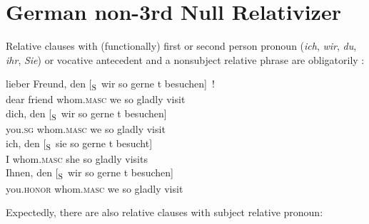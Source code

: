 \documentclass[output=paper]{LSP/langsci}
\begin{document}
\section{German non-3rd Null Relativizer}

\randnum\label{rn:15-8}Relative clauses with (functionally) first or second person pronoun
(\textit{ich}, \textit{wir}, \textit{du}, \textit{ihr}, \textit{Sie}) or vocative antecedent and a nonsubject
relative phrase are obligatorily :

\begin{exe}
\ex%
\label{ex:15-3}
\begin{xlist}
\ex%
\label{ex:15-3a}
\gll lieber Freund, den               [\textsubscript{S}~wir so gerne t besuchen]~!\\
     dear friend    whom.\textsc{masc} \hphantom{[\textsubscript{S}~}we so gladly {} visit\\
\ex%
\label{ex:15-3b}
\gll
dich, den [\textsubscript{S}~wir so gerne t besuchen] \\
you.\textsc{sg} whom.\textsc{masc} \hphantom{[\textsubscript{S}~}we so gladly {} visit \\ 
\ex%
\label{ex:15-3c}
\gll
ich, den [\textsubscript{S}~sie so gerne t besucht] \\
I whom.\textsc{masc} \hphantom{[\textsubscript{S}~}she so gladly {} visits \\
\ex%
\label{ex:15-3d}
\gll
Ihnen, den [\textsubscript{S}~wir so gerne t besuchen] \\
you.\textsc{honor} whom.\textsc{masc} \hphantom{[\textsubscript{S}~}we so gladly {} visit \\
\end{xlist}
\end{exe}
{\randnum}Expectedly, there are also  relative clauses with subject relative pronoun:
\begin{exe}
\ex%
\label{ex:15-4}
\begin{xlist}
\pagebreak
{}
\end{xlist}
\end{exe}
\end{document}
